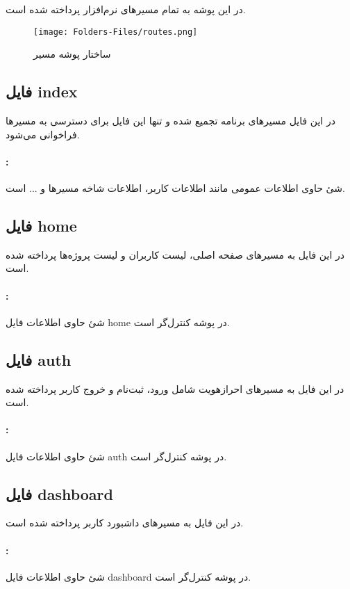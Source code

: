
در این پوشه به تمام مسیر‌های نرم‌افزار پرداخته شده است.
\begin{figure}[H]
	\texttt{[image: Folders-Files/routes.png]}
	\centering
	\caption{ساختار پوشه مسیر}
	\label{fig:folder:routes}
\end{figure}

\subsection{فایل index}
در این فایل مسیرهای برنامه تجمیع شده و تنها این فایل برای دسترسی به مسیرها فراخوانی می‌شود.

\paragraph{:}
شئ حاوی اطلاعات عمومی مانند اطلاعات کاربر، اطلاعات شاخه مسیرها و ... است.

\subsection{فایل home}
در این فایل به مسیرهای صفحه اصلی، لیست کاربران و لیست پروژه‌ها پرداخته شده است.
\paragraph{:}
شئ حاوی اطلاعات فایل home در پوشه کنترل‌گر است.

\subsection{فایل auth}
در این فایل به مسیرهای احرازهویت شامل ورود، ثبت‌نام و خروج کاربر پرداخته شده است.

\paragraph{:}
شئ حاوی اطلاعات فایل auth در پوشه کنترل‌گر است.

\subsection{فایل dashboard}
در این فایل به مسیرهای داشبورد کاربر پرداخته شده است.

\paragraph{:}
شئ حاوی اطلاعات فایل dashboard در پوشه کنترل‌گر است.

